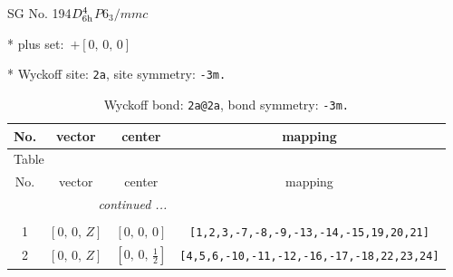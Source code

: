 \documentclass[fleqn,8pt]{jsarticle}
\begin{document}
\setcounter{MaxMatrixCols}{32}

\renewcommand{\tablename}{Table~}
\renewcommand{\figurename}{Figure~}
\begin{center}
\LARGE
SG No. 194\quad$D_{\rm 6h}^{4}$\quad$P6_3/mmc$\quad[ hexagonal ]
\end{center}

* plus set:\,\,\,$+\left[ 0,\, 0,\, 0 \right]$


* Wyckoff site: {\tt 2a}, site symmetry: {\tt -3m.}
\renewcommand{\arraystretch}{1.2}
\begin{longtable}{cccc}
\caption{Wyckoff bond: {\tt 2a@2a}, bond symmetry: {\tt -3m.}}
 \\
 \hline \hline
No. & vector & center & mapping \\ \hline \endfirsthead

\multicolumn{3}{l}{\tablename\ \thetable{}} \\
 \hline \hline
No. & vector & center & mapping \\ \hline \endhead

 \hline \hline
\multicolumn{3}{r}{\footnotesize\it continued ...} \\ \endfoot

 \hline \hline
\multicolumn{3}{r}{} \\ \endlastfoot

1 & $\left[ 0,\, 0,\, Z \right]$ & $\left[ 0,\, 0,\, 0 \right]$ & {\tt [1,2,3,-7,-8,-9,-13,-14,-15,19,20,21]} \\ \hline
2 & $\left[ 0,\, 0,\, Z \right]$ & $\left[ 0,\, 0,\, \frac{1}{2} \right]$ & {\tt [4,5,6,-10,-11,-12,-16,-17,-18,22,23,24]} \\
\end{longtable}
\renewcommand{\arraystretch}{1.2}
\end{document}
